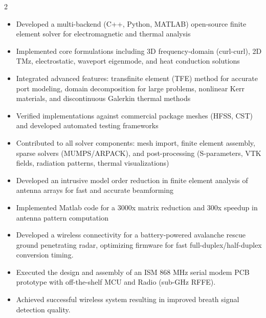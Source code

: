 \documentclass[9pt,a4paper,ragged2e,withhyper]{altacv} %
\begin{document}
\begin{paracol}{2}
\begin{itemize}
\item Developed a multi-backend (C++, Python, MATLAB) open-source finite element solver for electromagnetic and thermal analysis
\item Implemented core formulations including 3D frequency-domain (curl-curl), 2D TMz, electrostatic, waveport eigenmode, and heat conduction solutions
\item Integrated advanced features: transfinite element (TFE) method for accurate port modeling, domain decomposition for large problems, nonlinear Kerr materials, and discontinuous Galerkin thermal methods
\item Verified implementations against commercial package meshes (HFSS, CST) and developed automated testing frameworks
\item Contributed to all solver components: mesh import, finite element assembly, sparse solvers (MUMPS/ARPACK), and post-processing (S-parameters, VTK fields, radiation patterns, thermal visualizations)
\end{itemize}
\divider

\begin{itemize}
\item Developed an intrusive model order reduction in finite element analysis of antenna arrays for fast and accurate beamforming
\item Implemented Matlab code for a 3000x matrix reduction and 300x speedup in antenna pattern computation
\end{itemize}
\divider

\begin{itemize}
\item Developed a wireless connectivity for a battery-powered avalanche rescue ground penetrating radar, optimizing firmware for fast full-duplex/half-duplex conversion timing.
\item Executed the design and assembly of an ISM 868 MHz serial modem PCB prototype with off-the-shelf MCU and Radio (sub-GHz RFFE).
\item Achieved successful wireless system resulting in improved breath signal detection quality.
\end{itemize}



\end{paracol}
\end{document}
